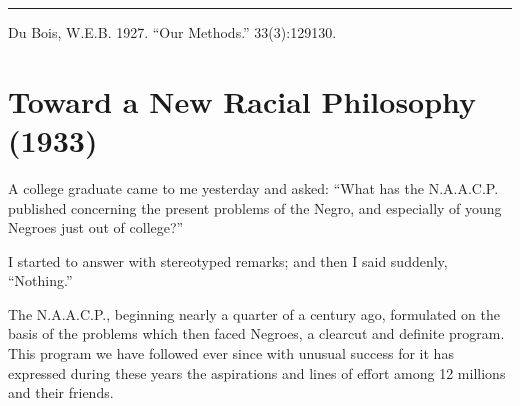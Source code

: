\documentclass[letterpaper,10pt,english]{jupyterBook}
\begin{document}
\bigskip\hrule\bigskip


\sphinxAtStartPar
{} Du Bois, W.E.B. 1927. “Our Methods.”  33(3):129\sphinxhyphen{}130.


\section{Toward a New Racial Philosophy (1933)}
\label{\detokenize{Volumes/40/01/toward_a_new_racial_philosophy:toward-a-new-racial-philosophy-1933}}\label{\detokenize{Volumes/40/01/toward_a_new_racial_philosophy::doc}}
\sphinxAtStartPar
A college graduate came to me yesterday and asked: “What has the N.A.A.C.P. published concerning the present problems of the Negro, and especially of young Negroes just out of college?”

\sphinxAtStartPar
I started to answer with stereotyped remarks; and then I said suddenly, “Nothing.”

\sphinxAtStartPar
The N.A.A.C.P., beginning nearly a quarter of a century ago, formulated on the basis of the problems which then faced Negroes, a clear\sphinxhyphen{}cut and definite program. This program we have followed ever since with unusual success for it has expressed during these years the aspirations and lines of effort among 12 millions and their friends.
\end{document}
